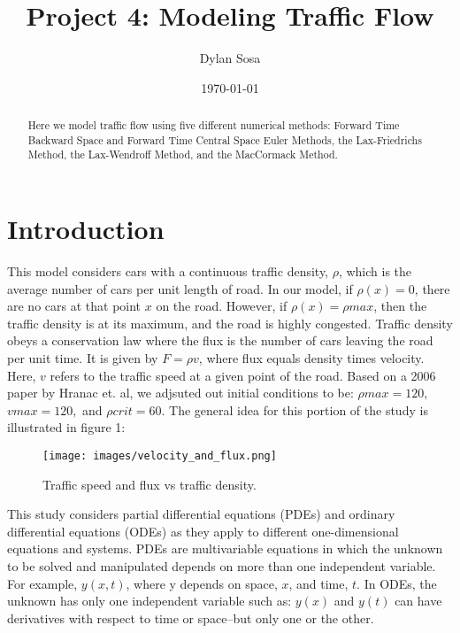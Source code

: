 \documentclass{article}
\title{Project 4: Modeling Traffic Flow}
\author{Dylan Sosa}
\date{\specialdate\today}
\begin{document}
\maketitle

\begin{abstract}
Here we model traffic flow using  five different numerical methods: Forward Time Backward Space and Forward Time Central Space Euler Methods, the Lax-Friedrichs Method, the Lax-Wendroff Method, and the MacCormack Method.
\end{abstract}

\section{Introduction}

This model considers cars with a continuous traffic density, $\rho$, which is the average number of cars per unit length of road. In our model, if $\rho(x)=0$, there are no cars at that point $x$ on the road. However, if $\rho(x)=\rho max$, then the traffic density is at its maximum, and the road is highly congested.
Traffic density obeys a conservation law where the flux is the number of cars leaving the road per unit time. It is given by $F = \rho v$, where flux equals density times velocity. Here, $v$ refers to the traffic speed at a given point of the road. Based on a 2006 paper by Hranac et. al, we adjsuted out initial conditions to be: $\rho max = 120,$ $vmax = 120,$ and $\rho crit = 60.$ The general idea for this portion of the study is illustrated in figure 1: \cite{hranac2006empirical}\par
\begin{figure}[H]
\begin{center}
\texttt{[image: images/velocity\_and\_flux.png]}
\caption{Traffic speed and flux vs traffic density.}
\end{center}
\end{figure}
This study considers partial differential equations (PDEs) and ordinary differential equations (ODEs) as they apply to different one-dimensional equations and systems. PDEs are multivariable equations in which the unknown to be solved and manipulated depends on more than one independent variable. For example, $y(x,t)$, where y depends on space, $x$, and time, $t.$ In ODEs, the unknown has only one independent variable such as: $y(x)$ and $y(t)$ can have derivatives with respect to time or space--but only one or the other.\par
\end{document}
